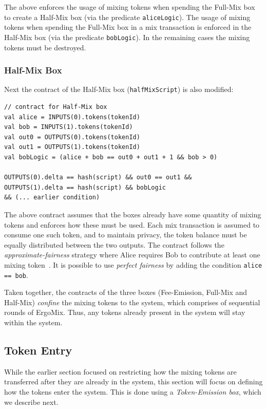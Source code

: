 \documentclass[11pt]{article}
\newcommand{\mixname}{ErgoMix\xspace}
\begin{document}
The above enforces the usage of mixing tokens when spending the Full-Mix box to create a Half-Mix box (via the predicate \texttt{aliceLogic}). The usage of mixing tokens when spending the Full-Mix box in a mix transaction is enforced in the Half-Mix box (via the predicate \texttt{bobLogic}). In the remaining cases the mixing tokens must be destroyed.  

\subsubsection{Half-Mix Box}
Next the contract of the Half-Mix box (\texttt{halfMixScript}) is also modified:
\begin{Verbatim}[frame=single]
// contract for Half-Mix box
val alice = INPUTS(0).tokens(tokenId)
val bob = INPUTS(1).tokens(tokenId)
val out0 = OUTPUTS(0).tokens(tokenId)
val out1 = OUTPUTS(1).tokens(tokenId)
val bobLogic = (alice + bob == out0 + out1 + 1 && bob > 0) 
  
OUTPUTS(0).delta == hash(script) && out0 == out1 &&
OUTPUTS(1).delta == hash(script) && bobLogic
&& (... earlier condition)
\end{Verbatim}

The above contract assumes that the boxes already have some quantity of mixing tokens and enforces how these must be used. Each mix transaction is assumed to consume one such token, and to maintain privacy, the token balance must be equally distributed between the two outputs. The contract follows the {\em approximate-fairness} strategy where Alice requires Bob to contribute at least one mixing token~\cite{advtutorial}. It is possible to use {\em perfect fairness} by adding the condition \texttt{alice == bob}. 

Taken together, the contracts of the three boxes (Fee-Emission, Full-Mix and Half-Mix) {\em confine} the mixing tokens to the system, which comprises of sequential rounds of \mixname. Thus, any tokens already present in the system will stay within the system. 

\subsection{Token Entry}

While the earlier section focused on restricting how the mixing tokens are transferred after they are already in the system, this section will focus on defining how the tokens enter the system. This is done using a {\em Token-Emission box}, which we describe next. 
\end{document}

